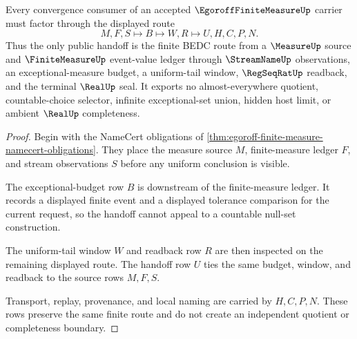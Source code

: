 \begin{theorem}
\label{thm:egoroff-finite-measure-uniform-window-handoff}
Every convergence consumer of an accepted $\EgoroffFiniteMeasureUp$ carrier must factor through the displayed route
$$
M,F,S \longmapsto B \longmapsto W,R \longmapsto U,H,C,P,N.
$$
Thus the only public handoff is the finite BEDC route from a $\MeasureUp$ source and $\FiniteMeasureUp$ event-value ledger through $\StreamNameUp$ observations, an exceptional-measure budget, a uniform-tail window, $\RegSeqRatUp$ readback, and the terminal $\RealUp$ seal. It exports no almost-everywhere quotient, countable-choice selector, infinite exceptional-set union, hidden host limit, or ambient $\RealUp$ completeness.
\end{theorem}
\begin{proof}
Begin with the NameCert obligations of \autoref{thm:egoroff-finite-measure-namecert-obligations}. They place the measure source $M$, finite-measure ledger $F$, and stream observations $S$ before any uniform conclusion is visible.

The exceptional-budget row $B$ is downstream of the finite-measure ledger. It records a displayed finite event and a displayed tolerance comparison for the current request, so the handoff cannot appeal to a countable null-set construction.

The uniform-tail window $W$ and readback row $R$ are then inspected on the remaining displayed route. The handoff row $U$ ties the same budget, window, and readback to the source rows $M,F,S$.

Transport, replay, provenance, and local naming are carried by $H,C,P,N$. These rows preserve the same finite route and do not create an independent quotient or completeness boundary.
\end{proof}



